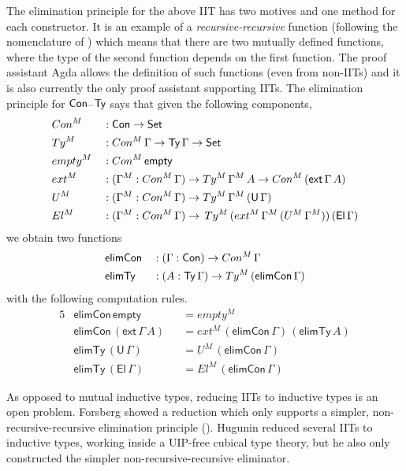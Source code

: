 \documentclass[a4paper,UKenglish,cleveref, autoref]{lipics-v2019}
\begin{document}
The elimination principle for the above IIT has two motives and one method
for each constructor. It is an example of a \emph{recursive-recursive}
function (following the nomenclature of \cite{forsberg-phd}) which
means that there are two mutually defined functions, where the type of
the second function depends on the first function. The proof assistant
Agda \cite{norell07thesis} allows the definition of such functions
(even from non-IITs) and it is also currently the only proof assistant
supporting IITs. The elimination principle for $\mathsf{Con}$--$\mathsf{Ty}$ says that
given the following components,
\begin{alignat*}{5}
  & Con^M && : \mathsf{Con}\rightarrow\mathsf{Set} \\
  & Ty^M && : Con^M\,\Gamma\rightarrow\mathsf{Ty}\,\Gamma\rightarrow\mathsf{Set} \\
  & empty^M && : Con^M\,\mathsf{empty} \\
  & ext^M && : (\Gamma^M:Con^M\,\Gamma)\rightarrow Ty^M\,\Gamma^M\,A\rightarrow Con^M\,(\mathsf{ext}\,\Gamma\,A) \\
  & U^M && : (\Gamma^M:Con^M\,\Gamma)\rightarrow Ty^M\,\Gamma^M\,(\mathsf{U}\,\Gamma) \\
  & El^M && : (\Gamma^M:Con^M\,\Gamma)\rightarrow\,Ty^M\,(ext^M\,\Gamma^M\,(U^M\,\Gamma^M))\,(\mathsf{El}\,\Gamma)
\end{alignat*}
we obtain two functions
\begin{alignat*}{5}
  & \mathsf{elimCon} && : (\Gamma:\mathsf{Con})\rightarrow Con^M\,\Gamma \\
  & \mathsf{elimTy} && : (A:\mathsf{Ty}\,\Gamma)\rightarrow Ty^M\,(\mathsf{elimCon}\,\Gamma)
\end{alignat*}
with the following computation rules.
\begin{alignat*}{5}
  & \mathsf{elimCon}\,\mathsf{empty} && = empty^M \\
  & \mathsf{elimCon}\,(\mathsf{ext}\,\Gamma\,A) && = ext^M\,(\mathsf{elimCon}\,\Gamma)\,(\mathsf{elimTy}\,A) \\
  & \mathsf{elimTy}\,(\mathsf{U}\,\Gamma) && = U^M\,(\mathsf{elimCon}\,\Gamma) \\
  & \mathsf{elimTy}\,(\mathsf{El}\,\Gamma) && = El^M\,(\mathsf{elimCon}\,\Gamma)
\end{alignat*}

As opposed to mutual inductive types, reducing IITs to inductive types is an
open problem. Forsberg \cite{forsberg-phd} showed a reduction which only
supports a simpler, non-recursive-recursive elimination principle
(). Hugunin \cite{jasper} reduced several IITs to inductive types,
working inside a UIP-free cubical type theory, but he also only constructed the
simpler non-recursive-recursive eliminator.
\end{document}
